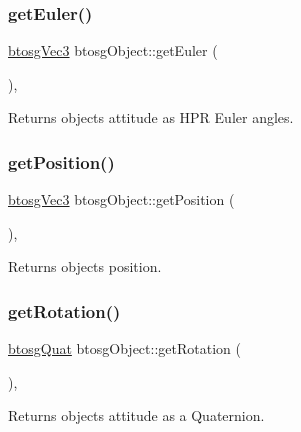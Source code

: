 \subsubsection{\texorpdfstring{getEuler()}{getEuler()}}
{\footnotesize\ttfamily \mbox{\hyperlink{classbtosgVec3}{btosg\+Vec3}} btosg\+Object\+::get\+Euler (\begin{DoxyParamCaption}{ }\end{DoxyParamCaption})\hspace{0.3cm}{\ttfamily [inline]}, {\ttfamily [inherited]}}

Returns object\textquotesingle{}s attitude as H\+PR Euler angles. \mbox{\label{classbtosgObject_a3dadd5da8f2a312e44a039446b93d4cd}} 
\subsubsection{\texorpdfstring{getPosition()}{getPosition()}}
{\footnotesize\ttfamily \mbox{\hyperlink{classbtosgVec3}{btosg\+Vec3}} btosg\+Object\+::get\+Position (\begin{DoxyParamCaption}{ }\end{DoxyParamCaption})\hspace{0.3cm}{\ttfamily [inline]}, {\ttfamily [inherited]}}

Returns object\textquotesingle{}s position. \mbox{\label{classbtosgObject_a3b825999ad3a51bde743d4085ff19dae}} 
\subsubsection{\texorpdfstring{getRotation()}{getRotation()}}
{\footnotesize\ttfamily \mbox{\hyperlink{classbtosgQuat}{btosg\+Quat}} btosg\+Object\+::get\+Rotation (\begin{DoxyParamCaption}{ }\end{DoxyParamCaption})\hspace{0.3cm}{\ttfamily [inline]}, {\ttfamily [inherited]}}

Returns object\textquotesingle{}s attitude as a Quaternion. \mbox{\label{classbtosgObject_a91838b8235579da178fcc06e6d3d47f3}} 
